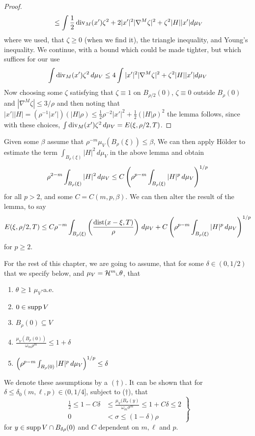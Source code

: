 \begin{proof}
\begin{align*}
   &\le \int \frac{1}{2}\operatorname{div}_M(x')\zeta^2 + 2 |x'|^2 |\nabla^M \zeta|^2 + \zeta^2 |H| |x'| d\mu_V \\
\end{align*}
where we used, that $\zeta \ge 0$ (when we find it), the triangle inequality, and Young's inequality. We continue, with a bound which could be made tighter, but which suffices for our use
\[
    \int \operatorname{div}_M(x')\zeta^2 \, d\mu_V \le 4 \int |x'|^2 |\nabla^M \zeta|^2 + \zeta^2 |H| |x'| d\mu_V
\]
Now choosing some $\zeta$ satisfying that $\zeta \equiv 1$ on $B_{\rho/2}(0)$, $\zeta \equiv 0$ outside $B_{\rho}(0)$ and $|\nabla^M \zeta| \le 3 / \rho$ and then noting that $|x'||H| = (\rho^{-1}|x'|)(|H|\rho) \le \frac{1}{2}\rho^{-2}|x'|^2 + \frac{1}{2}(|H|\rho)^2$ the lemma follows, since with these choices, $\int \operatorname{div}_M(x')\zeta^2\,d\mu_V=E(\xi,\rho/2,T)$.
\end{proof}

Given some $\beta$ assume that $\rho^{-m}\mu_V(B_{\rho}(\xi)) \le \beta$, We can then apply Hölder to estimate the term $\int_{B_{\rho}(\xi)}|H|^2\,d\mu_V$ in the above lemma and obtain
\[
    \rho^{2-m} \int_{B_{\rho}(\xi)}|H|^2\,d\mu_V \le C \left(\rho^{p-m} \int_{B_{\rho}(\xi)}|H|^p\,d\mu_V \right)^{1/p}
\]
for all $p > 2$, and some $C=C(m,p,\beta)$. We can then alter the result of the lemma, to say
\[
    E(\xi, \rho/2, T) \le C\rho^{-m} \int_{B_{\rho}(\xi)} \left( \frac{\operatorname{dist}(x-\xi, T)}{\rho} \right) \, d\mu_V + C \left(\rho^{p-m} \int_{B_{\rho}(\xi)}|H|^p\,d\mu_V \right)^{1/p}
\]
for $p \ge 2$.

For the rest of this chapter, we are going to assume, that for some $\delta \in (0, 1/2)$ that we specify below, and $\mu_V = \mathcal{H}^m \llcorner \theta$, that
\begin{enumerate}
\item $\theta \ge 1$ $\mu_V$-a.e.
\item $0 \in \operatorname{supp} V$
\item $B_{\rho}(0) \subseteq V$
\item $\frac{\mu_V(B_{\rho}(0))}{\omega_m \rho^m} \le 1 + \delta$ 
\item $\left(\rho^{p-m} \int_{B_{\rho}(0)}|H|^p\,d\mu_V \right)^{1/p} \le \delta$
\end{enumerate}
We denote these assumptions by a $(\dagger)$. It can be shown that for $\delta \le \delta_0(m,\ell,p) \in (0,1/4]$, subject to ($\dagger$), that
\begin{equation}
    \left.\begin{aligned}
    \frac{1}{2}\le 1-C\delta &\le \frac{\mu_V(B_{\sigma}(y)}{\omega_m\sigma^m} \le 1+C\delta \le 2 \label{eq: extra bs}\\
    0 &< \sigma \le (1-\delta)\rho
    \end{aligned}\right\}
\end{equation}
for $y \in \operatorname{supp} V \cap B_{\delta\rho}(0)$ and $C$ dependent on $m, \ell$ and $p$.

